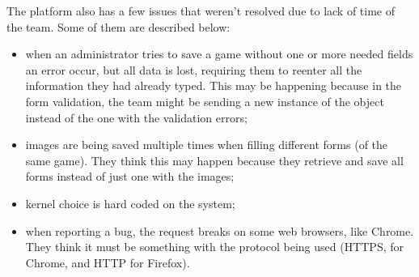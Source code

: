 The platform also has a few issues that weren't resolved due to lack of time of the team. Some of them are described below:

\begin{itemize}
\item when an administrator tries to save a game without one or more needed fields an error occur, but all data is lost, requiring them to reenter all the information they had already typed. This may be happening because in the form validation, the team might be sending a new instance of the object instead of the one with the validation errors;

\item images are being saved multiple times when filling different forms (of the same game). They think this may happen because they retrieve and save all forms instead of just one with the images;

\item kernel choice is hard coded on the system;

\item when reporting a bug, the request breaks on some web browsers, like Chrome. They think it must be something with the protocol being used (HTTPS, for Chrome, and HTTP for Firefox).
\end{itemize}
